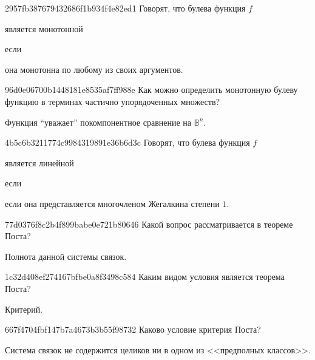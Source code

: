 \begin{note}{2957fb387679432686f1b934f4e82ed1}
    Говорят, что булева функция \({ f }\) \begin{icloze}{2}является монотонной\end{icloze} если \begin{icloze}{1}она монотонна по любому из своих аргументов.\end{icloze}
\end{note}

\begin{note}{96d0e06700b1448181e8535af7ff988e}
    Как можно определить монотонную булеву функцию в терминах частично упорядоченных множеств?

    \begin{cloze}{1}
        Функция ``уважает'' покомпонентное сравнение на \({ \mathbb B^{n} }\).
    \end{cloze}
\end{note}

\begin{note}{4b5c6b3211774c9984319891e36b6d3c}
    Говорят, что булева функция \({ f }\) \begin{icloze}{2}является линейной\end{icloze} если
    \begin{icloze}{1}
        если она представляется многочленом Жегалкина степени \({ 1 }\).
    \end{icloze}
\end{note}

\begin{note}{77d0376f8c2b4f899babe0e721b80646}
    Какой вопрос рассматривается в теореме Поста?

    \begin{cloze}{1}
        Полнота данной системы связок.
    \end{cloze}
\end{note}

\begin{note}{1c32d408ef274167bfbe0a8f3498c584}
    Каким видом условия является теорема Поста?

    \begin{cloze}{1}
        Критерий.
    \end{cloze}
\end{note}

\begin{note}{667f4704fbf147b7a4673b3b55f98732}
    Каково условие критерия Поста?

    \begin{cloze}{1}
        Система связок не содержится целиков ни в одном из <<предполных классов>>.
    \end{cloze}
\end{note}

